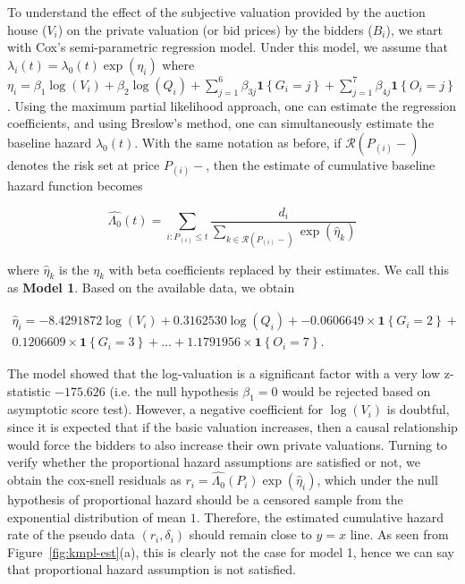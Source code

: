 \documentclass[a4paper,12pt]{article}
\newcommand{\ind}[1]{\boldsymbol{1}\left\{ #1 \right\}}
\newcommand{\R}{\mathcal{R}}
\begin{document}
To understand the effect of the subjective valuation provided by the auction house ($V_i$) on the private valuation (or bid prices) by the bidders ($B_i$), we start with Cox's semi-parametric regression model. Under this model, we assume that $\lambda_i(t) = \lambda_0(t) \exp(\eta_i)$ where $\eta_i = \beta_1 \log(V_i) + \beta_2 \log(Q_i) + \sum_{j=1}^6 \beta_{3j} \ind{G_i = j} + \sum_{j=1}^7 \beta_{4j} \ind{O_i = j}$. Using the maximum partial likelihood approach, one can estimate the regression coefficients, and using Breslow's method, one can simultaneously estimate the baseline hazard $\lambda_0(t)$. With the same notation as before, if $\R(P_{(i)}-)$ denotes the risk set at price $P_{(i)}-$, then the estimate of cumulative baseline hazard function becomes 

\begin{equation}
\widehat{\Lambda_0}(t) = \sum_{i: P_{(i)} \leq t} \dfrac{d_i}{\sum_{k \in \R(P_{(i)}-)} \exp\left( \widehat{\eta}_k \right) }
\label{eqn:breslow-est}
\end{equation}

\noindent where $\widehat{\eta}_k$ is the $\eta_k$ with beta coefficients replaced by their estimates. We call this as \textbf{Model 1}. Based on the available data, we obtain

\begin{multline}
    \widehat{\eta}_i = -8.4291872 \log(V_i) + 0.3162530 \log(Q_i) + -0.0606649 \times \ind{G_i = 2} + \\
    0.1206609 \times \ind{G_i = 3} + \dots + 1.1791956\times\ind{O_i = 7}. 
    \label{eqn:model1-fit}
\end{multline}

\noindent The model showed that the log-valuation is a significant factor with a very low z-statistic $-175.626$ (i.e. the null hypothesis $\beta_{1} = 0$ would be rejected based on asymptotic score test). However, a negative coefficient for $\log(V_i)$ is doubtful, since it is expected that if the basic valuation increases, then a causal relationship would force the bidders to also increase their own private valuations. Turning to verify whether the proportional hazard assumptions are satisfied or not, we obtain the cox-snell residuals as $r_i = \widehat{\Lambda_0}(P_i)\exp(\widehat{\eta}_i)$, which under the null hypothesis of proportional hazard should be a censored sample from the exponential distribution of mean $1$. Therefore, the estimated cumulative hazard rate of the pseudo data $(r_i, \delta_i)$ should remain close to $y = x$ line. As seen from Figure~\ref{fig:kmpl-est}(a), this is clearly not the case for model 1, hence we can say that proportional hazard assumption is not satisfied.
\end{document}
